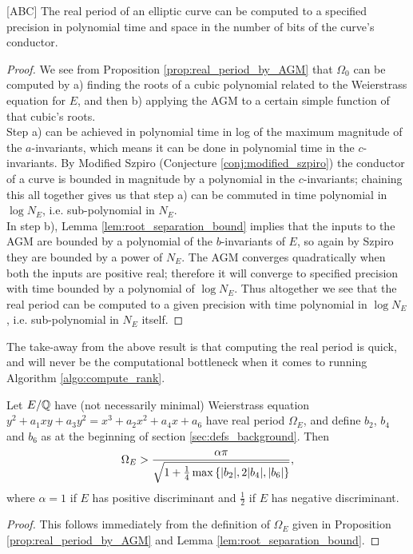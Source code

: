 \begin{corollary}\label{cor:real_period_time_complexity}[ABC]
The real period of an elliptic curve can be computed to a specified precision in polynomial time and space in the number of bits of the curve's conductor.
\end{corollary}
\begin{proof}
We see from Proposition \ref{prop:real_period_by_AGM} that $\Omega_0$ can be computed by a) finding the roots of a cubic polynomial related to the Weierstrass equation for $E$, and then b) applying the AGM to a certain simple function of that cubic's roots. \\

Step a) can be achieved in polynomial time in log of the maximum magnitude of the $a$-invariants, which means it can be done in polynomial time in the $c$-invariants. By Modified Szpiro (Conjecture \ref{conj:modified_szpiro}) the conductor of a curve is bounded in magnitude by a polynomial in the $c$-invariants; chaining this all together gives us that step a) can be commuted in time polynomial in $\log N_E$, i.e. sub-polynomial in $N_E$. \\

In step b), Lemma \ref{lem:root_separation_bound} implies that the inputs to the AGM are bounded by a polynomial of the $b$-invariants of $E$, so again by Szpiro they are bounded by a power of $N_E$. The AGM converges quadratically when both the inputs are positive real; therefore it will converge to specified precision with time bounded by a polynomial of $\log N_E$. Thus altogether we see that the real period can be computed to a given precision with time polynomial in $\log N_E$, i.e. sub-polynomial in $N_E$ itself.
\end{proof}

The take-away from the above result is that computing the real period is quick, and will never be the computational bottleneck when it comes to running Algorithm \ref{algo:compute_rank}. \\

\begin{corollary}[S.]\label{ineq:Omega_bn_bound}
Let $E/\mathbb{Q}$ have (not necessarily minimal) Weierstrass equation \\
$y^2 + a_1 xy + a_3 y^2 = x^3 + a_2 x^2 + a_4 x + a_6$ have real period $\Omega_E$, and define $b_2$, $b_4$ and $b_6$ as at the beginning of section \ref{sec:defs_background}. Then
\begin{equation}
\Omega_E > \frac{\alpha \pi}{\sqrt{1+\frac{1}{4}\max\left\{|b_2|,2|b_4|,|b_6|\right\}}},
\end{equation}
where $\alpha = 1$ if $E$ has positive discriminant and $\frac{1}{2}$ if $E$ has negative discriminant.
\end{corollary}
\begin{proof}
This follows immediately from the definition of $\Omega_E$ given in Proposition \ref{prop:real_period_by_AGM} and Lemma \ref{lem:root_separation_bound}.
\end{proof}

